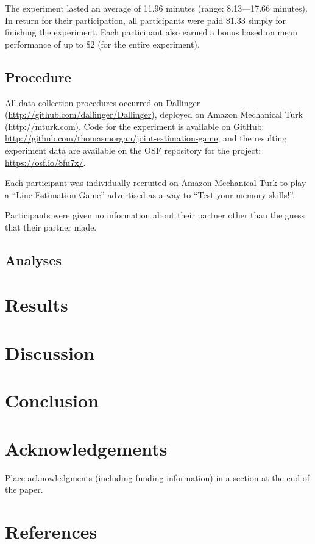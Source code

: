 \documentclass[10pt, letterpaper]{article}
\begin{document}
The experiment lasted an average of 11.96 minutes (range: 8.13---17.66
minutes). In return for their participation, all participants were paid
\$1.33 simply for finishing the experiment. Each participant also earned
a bonus based on mean performance of up to \$2 (for the entire
experiment).

\subsection{Procedure}\label{procedure}

All data collection procedures occurred on Dallinger
(\url{http://github.com/dallinger/Dallinger}), deployed on Amazon
Mechanical Turk (\url{http://mturk.com}). Code for the experiment is
available on GitHub:
\url{http://github.com/thomasmorgan/joint-estimation-game}, and the
resulting experiment data are available on the OSF repository for the
project: \url{https://osf.io/8fu7x/}.

Each participant was individually recruited on Amazon Mechanical Turk to
play a ``Line Estimation Game'' advertised as a way to ``Test your
memory skills!''.

Participants were given no information about their partner other than
the guess that their partner made.

\subsection{Analyses}\label{analyses}

\section{Results}\label{results}

\section{Discussion}\label{discussion}

\section{Conclusion}\label{conclusion}

\section{Acknowledgements}\label{acknowledgements}

Place acknowledgments (including funding information) in a section at
the end of the paper.

\section{References}\label{references}

\setlength{\parindent}{-0.1in} \setlength{\leftskip}{0.125in} \noindent
\end{document}
